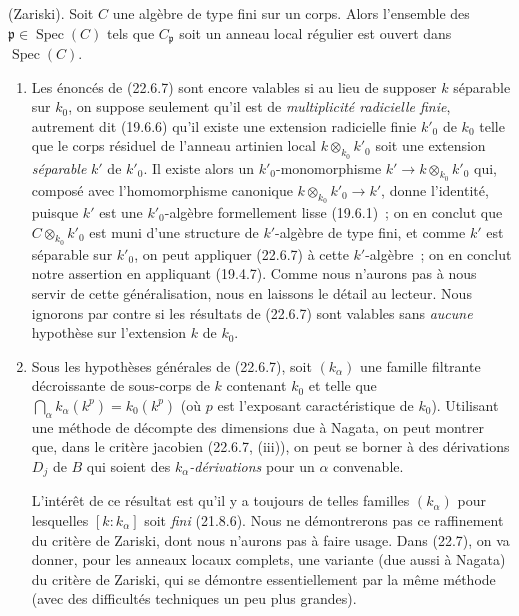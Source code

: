 \begin{corollary}[22.6.8]
\label{0.22.6.8-fr}
\textnormal{(Zariski).}
Soit $C$ une algèbre de type fini sur un corps. Alors l'ensemble des
$\mathfrak p\in\operatorname{Spec}(C)$ tels que $C_{\mathfrak p}$ soit un anneau local
régulier est \textup{ouvert} dans $\operatorname{Spec}(C)$.
\end{corollary}

\begin{remarks}[22.6.9]
\label{0.22.6.9-fr}
\begin{enumerate}
  \item[\rm(i)] Les énoncés de (22.6.7) sont encore valables si au lieu de
  supposer $k$ séparable sur $k_0$, on suppose seulement qu'il est de
  \emph{multiplicité radicielle finie}, autrement dit (19.6.6) qu'il existe
  une extension radicielle finie $k'_0$ de $k_0$ telle que le corps résiduel de
  l'anneau artinien local $k\otimes_{k_0}k'_0$ soit une extension \emph{séparable}
  $k'$ de $k'_0$. Il existe alors un $k'_0$-monomorphisme
  $k'\longrightarrow k\otimes_{k_0}k'_0$ qui, composé avec l'homomorphisme
  canonique $k\otimes_{k_0}k'_0\longrightarrow k'$, donne l'identité, puisque
  $k'$ est une $k'_0$-algèbre formellement lisse (19.6.1)~; on en conclut que
  $C\otimes_{k_0}k'_0$ est muni d'une structure de $k'$-algèbre de type fini,
  et comme $k'$ est séparable sur $k'_0$, on peut appliquer (22.6.7) à cette
  $k'$-algèbre~; on en conclut notre assertion en appliquant (19.4.7). Comme
  nous n'aurons pas à nous servir de cette généralisation, nous en laissons le
  détail au lecteur. Nous ignorons par contre si les résultats de (22.6.7) sont
  valables sans \emph{aucune} hypothèse sur l'extension $k$ de $k_0$.
  \item[\rm(ii)] Sous les hypothèses générales de (22.6.7), soit $(k_\alpha)$
  une famille filtrante décroissante de sous-corps de $k$ contenant $k_0$ et
  telle que
  $\bigcap_\alpha k_\alpha(k^p)=k_0(k^p)$ (où $p$ est l'exposant
  caractéristique de $k_0$). Utilisant une méthode de décompte des dimensions
  due à Nagata, on peut montrer que, dans le critère jacobien (22.6.7, (iii)),
  on peut se borner à des dérivations $D_j$ de $B$ qui soient des
  \emph{$k_\alpha$-dérivations} pour un $\alpha$ convenable.


  L'intérêt de ce résultat est qu'il y a toujours de telles familles
  $(k_\alpha)$ pour lesquelles $[k:k_\alpha]$ soit \emph{fini} (21.8.6). Nous ne
  démontrerons pas ce raffinement du critère de Zariski, dont nous n'aurons pas
  à faire usage. Dans (22.7), on va donner, pour les anneaux locaux complets,
  une variante (due aussi à Nagata) du critère de Zariski, qui se démontre
  essentiellement par la même méthode (avec des difficultés techniques un peu
  plus grandes).
\end{enumerate}
\end{remarks}

